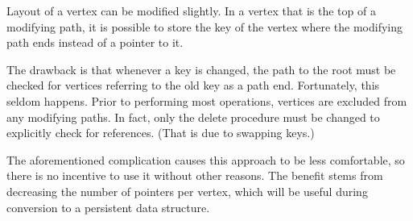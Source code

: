 Layout of a vertex can be modified slightly. In a vertex that is the top of a modifying path, it is possible to store the key of the vertex where the modifying path ends instead of a pointer to it.

The drawback is that whenever a key is changed, the path to the root must be checked for vertices referring to the old key as a path end. Fortunately, this seldom happens. 
Prior to performing most operations, vertices are excluded from any modifying paths. 
In fact, only the delete procedure must be changed to explicitly check for references. (That is due to swapping keys.)

The aforementioned complication causes this approach to be less comfortable, so there is no incentive to use it without other reasons. 
The benefit stems from decreasing the number of pointers per vertex, which will be useful during conversion to a persistent data structure.
